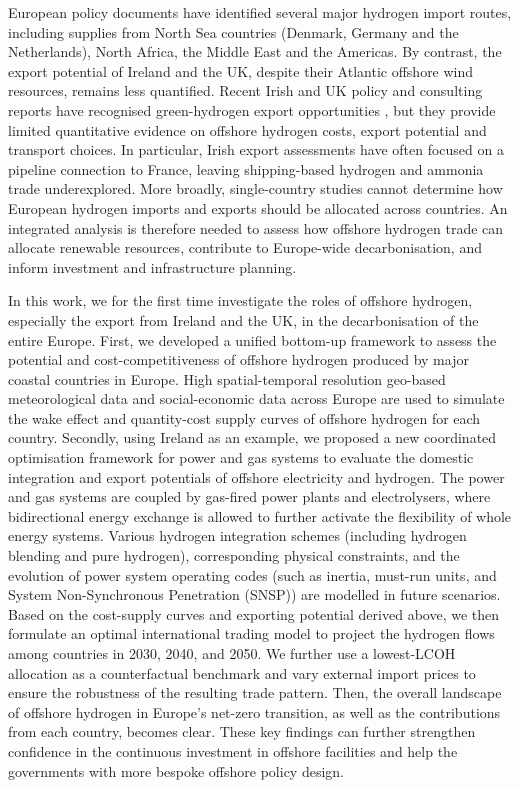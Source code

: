 \documentclass[pdflatex,sn-mathphys,Numbered]{sn-jnl}%
\begin{document}
European policy documents have identified several major hydrogen import routes,
including supplies from North Sea countries (Denmark, Germany and the Netherlands),
North Africa, the Middle East and the Americas. By contrast, the export potential
of Ireland and the UK, despite their Atlantic offshore wind resources, remains
less quantified. Recent Irish and UK policy and consulting reports have recognised
green-hydrogen export opportunities \cite{HydrogenImport, FutureFrameworkfor}, but
they provide limited quantitative evidence on offshore hydrogen costs, export
potential and transport choices. In particular, Irish export assessments have often
focused on a pipeline connection to France, leaving shipping-based hydrogen and
ammonia trade underexplored. More broadly, single-country studies cannot determine
how European hydrogen imports and exports should be allocated across countries.
An integrated analysis is therefore needed to assess how offshore hydrogen trade
can allocate renewable resources, contribute to Europe-wide decarbonisation, and
inform investment and infrastructure planning.

In this work, we for the first time investigate the roles of offshore hydrogen, especially the export from Ireland and the UK, in the decarbonisation of the entire Europe.
First, we developed a unified bottom-up framework to assess the potential and cost-competitiveness of offshore hydrogen produced by major coastal countries in Europe. High spatial-temporal resolution geo-based meteorological data and social-economic data across Europe are used to simulate the wake effect and quantity-cost supply curves of offshore hydrogen for each country.
Secondly, using Ireland as an example, we proposed a new coordinated optimisation framework for power and gas systems to evaluate the domestic integration and export potentials of offshore electricity and hydrogen. The power and gas systems are coupled by gas-fired power plants and electrolysers, where bidirectional energy exchange is allowed to further activate the flexibility of whole energy systems. Various hydrogen integration schemes (including hydrogen blending and pure hydrogen), corresponding physical constraints, and the evolution of power system operating codes (such as inertia, must-run units, and System Non-Synchronous Penetration (SNSP)) are modelled in future scenarios.
Based on the cost-supply curves and exporting potential derived above, we then formulate an optimal international trading model to project the hydrogen flows among countries in 2030, 2040, and 2050. We further use a lowest-LCOH allocation as a counterfactual benchmark and vary external import prices to ensure the robustness of the resulting trade pattern. Then, the overall landscape of offshore hydrogen in Europe's net-zero transition, as well as the contributions from each country, becomes clear. These key findings can further strengthen confidence in the continuous investment in offshore facilities and help the governments with more bespoke offshore policy design.
\end{document}
